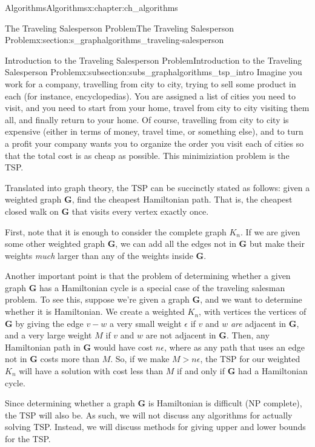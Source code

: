 \documentclass[oneside,10pt,]{book}
\numberwithin{equation}{section}
\newcommand{\bfG}{\mathbf{G}}
\begin{document}
\begin{chapterptx}{Algorithms}{}{Algorithms}{}{}{x:chapter:ch_algorithms}
\begin{sectionptx}{The Traveling Salesperson Problem}{}{The Traveling Salesperson Problem}{}{}{x:section:s_graphalgorithms_traveling-salesperson}
\begin{subsectionptx}{Introduction to the Traveling Salesperson Problem}{}{Introduction to the Traveling Salesperson Problem}{}{}{x:subsection:subs_graphalgorithms_tsp_intro}
Imagine you work for a company, travelling from city to city, trying to sell some product in each (for instance, encyclopedias).  You are assigned a list of cities you need to visit, and you need to start from your home, travel from city to city visiting them all, and finally return to your home.  Of course, travelling from city to city is expensive (either in terms of money, travel time, or something else), and to turn a profit your company wants you to organize the order you visit each of cities so that the total cost is as cheap as possible.  This minimiziation problem is the TSP.%
\par
Translated into graph theory, the TSP can be succinctly stated as follows: given a weighted graph \(\bfG\), find the cheapest Hamiltonian path. That is, the cheapest closed walk on \(\bfG\) that visits every vertex exactly once.%
\par
First, note that it is enough to consider the complete graph \(K_n\).  If we are given some other weighted graph \(\bfG\), we can add all the edges not in \(\bfG\) but make their weights \emph{much} larger than any of the weights inside \(\bfG\).%
\par
Another important point is that the problem of determining whether a given graph \(\bfG\) has a Hamiltonian cycle is a special case of the traveling salesman problem.  To see this, suppose we're given a graph \(\bfG\), and we want to determine whether it is Hamiltonian.  We create a weighted \(K_n\), with vertices the vertices of \(\bfG\) by giving the edge \(v-w\) a very small weight \(\epsilon\) if \(v\) and \(w\) \emph{are} adjacent in \(\bfG\), and a very large weight \(M\) if \(v\) and \(w\) \textasteriskcentered{}are not\textasteriskcentered{} adjacent in \(\bfG\).  Then, any Hamiltonian path in \(\bfG\) would have cost \(n\epsilon\), where as any path that uses an edge not in \(\bfG\) costs more than \(M\).  So, if we make \(M>n\epsilon\), the TSP for our weighted \(K_n\) will have a solution with cost less than \(M\) if and only if \(\bfG\) had a Hamiltonian cycle.%
\par
Since determining whether a graph \(\bfG\) is Hamiltonian is difficult (NP complete), the TSP will also be.  As such, we will not discuss any algorithms for actually solving TSP.  Instead, we will discuss methods for giving upper and lower bounds for the TSP.%
\end{subsectionptx}
%
%
\typeout{************************************************}
\typeout{************************************************}

\end{sectionptx}
\end{chapterptx}
\end{document}
